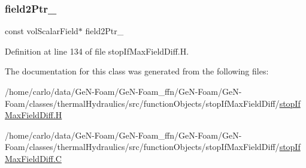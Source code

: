 \subsubsection{\texorpdfstring{field2\+Ptr\+\_\+}{field2Ptr\_}}
{\footnotesize\ttfamily const vol\+Scalar\+Field$\ast$ field2\+Ptr\+\_\+\hspace{0.3cm}{\ttfamily [protected]}}



Definition at line 134 of file stop\+If\+Max\+Field\+Diff.\+H.



The documentation for this class was generated from the following files\+:\begin{DoxyCompactItemize}
\item 
/home/carlo/data/\+Ge\+N-\/\+Foam/\+Ge\+N-\/\+Foam\+\_\+ffn/\+Ge\+N-\/\+Foam/\+Ge\+N-\/\+Foam/classes/thermal\+Hydraulics/src/function\+Objects/stop\+If\+Max\+Field\+Diff/\hyperlink{stopIfMaxFieldDiff_8H}{stop\+If\+Max\+Field\+Diff.\+H}\item 
/home/carlo/data/\+Ge\+N-\/\+Foam/\+Ge\+N-\/\+Foam\+\_\+ffn/\+Ge\+N-\/\+Foam/\+Ge\+N-\/\+Foam/classes/thermal\+Hydraulics/src/function\+Objects/stop\+If\+Max\+Field\+Diff/\hyperlink{stopIfMaxFieldDiff_8C}{stop\+If\+Max\+Field\+Diff.\+C}\end{DoxyCompactItemize}
